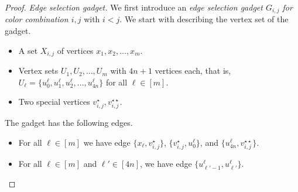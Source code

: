 \documentclass[a4paper,UKenglish,cleveref, autoref, thm-restate,anonymous]{lipics-v2021}
\begin{document}
\begin{proof}
    \emph{Edge selection gadget.} We first introduce an \emph{edge selection gadget $G_{i,j}$ for color combination $i,j$} with $i<j$. We start with describing the vertex set of the gadget.
    \begin{itemize}
        \item A set $X_{i,j}$ of vertices $x_1, x_2, \ldots, x_m$.
        \item Vertex sets $U_1, U_2, \ldots, U_m$ with $4n+1$ vertices each, that is, $U_\ell=\{u^\ell_0, u^\ell_1, u^\ell_2,\ldots, 
        u^\ell_{4n}\}$ for all $\ell\in[m]$. 
        \item Two special vertices $v_{i,j}^\star,v_{i,j}^{\star\star}$.
    \end{itemize}
    The gadget has the following edges.
    \begin{itemize}
        \item For all $\ell\in [m]$ we have edge $\{x_\ell,v_{i,j}^\star\}$, $\{v_{i,j}^\star,u^\ell_0\}$, and $\{u^\ell_{4n},v_{i,j}^{\star\star}\}$. 

        \item For all $\ell\in [m]$ and $\ell'\in [4n]$, we have edge $\{u^\ell_{\ell'-1},u^\ell_{\ell'}\}$.
    \end{itemize}


\end{proof}
\end{document}
